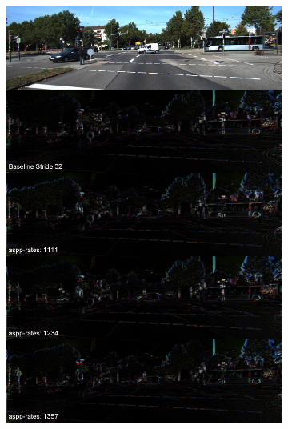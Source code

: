 \begin{figure}[h!]
\begin{subfigure}[c]{0.24\textwidth}
\includegraphics[width=\textwidth]{images/visual_comparisons/reconstruction_error/concat_015.png}
\end{subfigure}
\begin{subfigure}[c]{0.24\textwidth}

\end{subfigure}
\end{figure}
